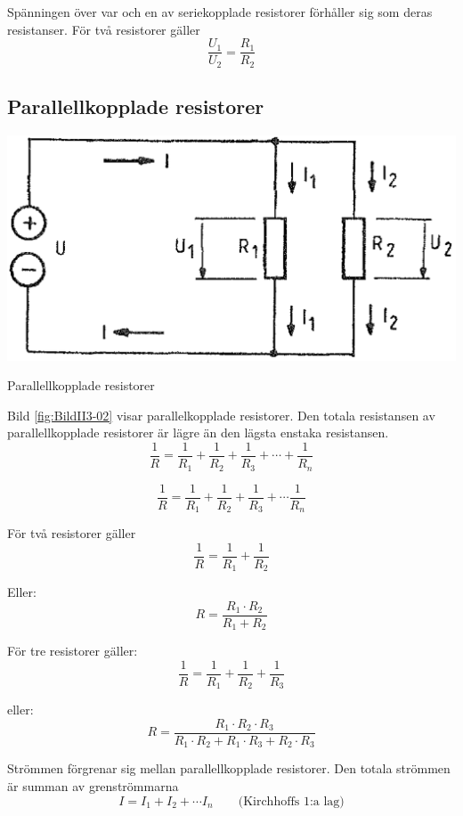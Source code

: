Spänningen över var och en av seriekopplade resistorer förhåller sig som deras
resistanser. För två resistorer gäller
\[   \dfrac{U_1}{U_2} = \dfrac{R_1}{R_2}   \]

\subsection{Parallellkopplade resistorer}

\begin{marginfigure}%
  \includegraphics[width=\textwidth]{images/cropped_pdfs/bild_2_3-02.pdf}
  \caption{Parallellkopplade resistorer}
  \label{fig:BildII3-02}
\end{marginfigure}

Bild \ref{fig:BildII3-02} visar parallelkopplade resistorer.
Den totala resistansen av parallellkopplade resistorer är lägre än den lägsta
enstaka resistansen.
\[ \frac{1}{R} = \frac{1}{R_1} + \frac{1}{R_2} +
   \frac{1}{R_3} + \cdots + \frac{1}{R_n} \]

\[
\frac{1}{R} = \frac{1}{R_1} + \frac{1}{R_2} + \frac{1}{R_3} + \cdots
\frac{1}{R_n}
\]

För två resistorer gäller
\[ \frac{1}{R} = \frac{1}{R_1} + \frac{1}{R_2} \]

Eller:
\[ R = \frac{R_1 \cdot R_2}{R_1 + R_2} \]

För tre resistorer gäller:
\[ \frac{1}{R} = \frac{1}{R_1} + \frac{1}{R_2} + \frac{1}{R_3} \]

eller:
\[ R = \frac{R_1\cdot R_2\cdot R_3}{R_1\cdot R_2 + R_1\cdot R_3 +
  R_2\cdot R_3} \]

Strömmen förgrenar sig mellan parallellkopplade resistorer. Den totala strömmen
är summan av grenströmmarna
\[ I = I_1 + I_2 + \cdots I_n \qquad \text{(Kirchhoffs 1:a lag)} \]

